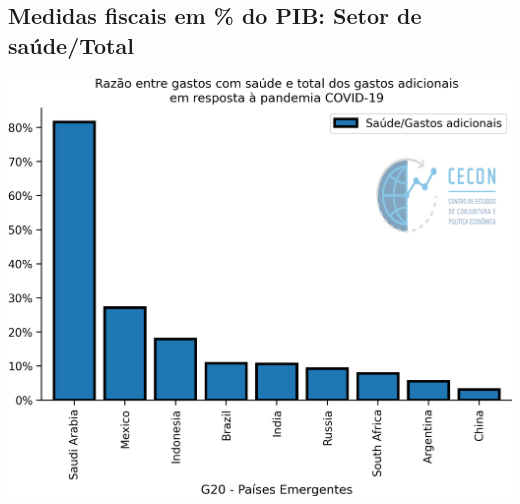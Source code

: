 \documentclass{SelfArx}
\begin{document}
\subsection*{Medidas fiscais em \% do PIB: Setor de saúde/Total}
\label{sec:org9bc215c}

\begin{center}
\includegraphics[width=.9\linewidth]{./figs/IMF/FiscalMonitor_Covid_total.png}
\end{center}
\end{document}
